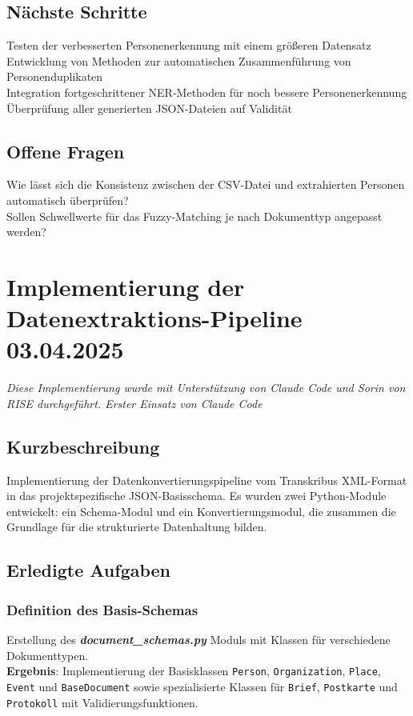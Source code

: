 \documentclass{article}
\begin{document}
\subsection*{Nächste Schritte}
 Testen der verbesserten Personenerkennung mit einem größeren Datensatz\\
 Entwicklung von Methoden zur automatischen Zusammenführung von Personenduplikaten\\
 Integration fortgeschrittener NER-Methoden für noch bessere Personenerkennung\\
 Überprüfung aller generierten JSON-Dateien auf Validität

\subsection*{Offene Fragen}
 Wie lässt sich die Konsistenz zwischen der CSV-Datei und extrahierten Personen automatisch überprüfen?\\
 Sollen Schwellwerte für das Fuzzy-Matching je nach Dokumenttyp angepasst werden?

\section{Implementierung der Datenextraktions-Pipeline \small 03.04.2025}
\small\textit{{Diese Implementierung wurde mit Unterstützung von Claude Code und Sorin von RISE durchgeführt. Erster Einsatz von Claude Code}}\\
\subsection*{Kurzbeschreibung}

Implementierung der Datenkonvertierungspipeline vom Transkribus XML-Format in das projektspezifische JSON-Basisschema. Es wurden zwei Python-Module entwickelt: ein Schema-Modul und ein Konvertierungsmodul, die zusammen die Grundlage für die strukturierte Datenhaltung bilden.

\subsection*{Erledigte Aufgaben}
\subsubsection*{\small Definition des Basis-Schemas}
 Erstellung des \textbf{\textit{document\_schemas.py}} Moduls mit Klassen für verschiedene Dokumenttypen.\\
\textbf{Ergebnis}: Implementierung der Basisklassen \texttt{Person}, \texttt{Organization}, \texttt{Place}, \texttt{Event} und \texttt{BaseDocument} sowie spezialisierte Klassen für \texttt{Brief}, \texttt{Postkarte} und \texttt{Protokoll} mit Validierungsfunktionen.
\end{document}
